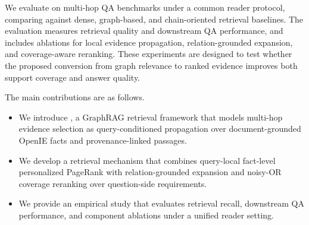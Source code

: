 We evaluate \methodname{} on multi-hop QA benchmarks under a common
reader protocol, comparing against dense, graph-based, and
chain-oriented retrieval baselines. The evaluation measures retrieval
quality and downstream QA performance, and includes ablations for local
evidence propagation, relation-grounded expansion, and coverage-aware
reranking. These experiments are designed to test whether the proposed
conversion from graph relevance to ranked evidence improves both support
coverage and answer quality.

The main contributions are as follows.
\begin{itemize}
    \item We introduce \methodname{}, a GraphRAG retrieval framework that
    models multi-hop evidence selection as query-conditioned propagation
    over document-grounded OpenIE facts and provenance-linked passages.
    \item We develop a retrieval mechanism that combines query-local
    fact-level personalized PageRank with relation-grounded expansion and
    noisy-OR coverage reranking over question-side requirements.
    \item We provide an empirical study that evaluates retrieval recall,
    downstream QA performance, and component ablations under a unified
    reader setting.
\end{itemize}
